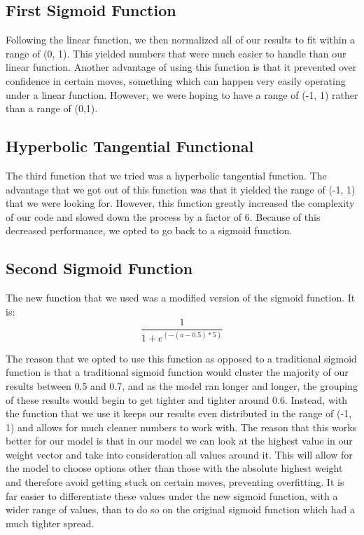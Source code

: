 \documentclass{article}
\begin{document}
\subsection{First Sigmoid Function}
Following the linear function, we then normalized all of our results to fit within a range of (0, 1). This yielded numbers that were much easier to handle than our linear function. Another advantage of using this function is that it prevented over confidence in certain moves, something which can happen very easily operating under a linear function. However, we were hoping to have a range of (-1, 1) rather than a range of (0,1).

\subsection{Hyperbolic Tangential Functional}
The third function that we tried was a hyperbolic tangential function. The advantage that we got out of this function was that it yielded the range of (-1, 1) that we were looking for. However, this function greatly increased the complexity of our code and slowed down the process by a factor of 6. Because of this decreased performance, we opted to go back to a sigmoid function.

\subsection{Second Sigmoid Function}
The new function that we used was a modified version of the sigmoid function. It is:
\[\frac{1}{1 + e^{(-(a-0.5) * 5)}}\]

The reason that we opted to use this function as opposed to a traditional sigmoid function is that a traditional sigmoid function would cluster the majority of our results between 0.5 and 0.7, and as the model ran longer and longer, the grouping of these results would begin to get tighter and tighter around 0.6. Instead, with the function that we use it keeps our results even distributed in the range of (-1, 1) and allows for much cleaner numbers to work with. The reason that this works better for our model is that in our model we can look at the highest value in our weight vector and take into consideration all values around it. This will allow for the model to choose options other than those with the absolute highest weight and therefore avoid getting stuck on certain moves, preventing overfitting. It is far easier to differentiate these values under the new sigmoid function, with a wider range of values, than to do so on the original sigmoid function which had a much tighter spread.
\end{document}
